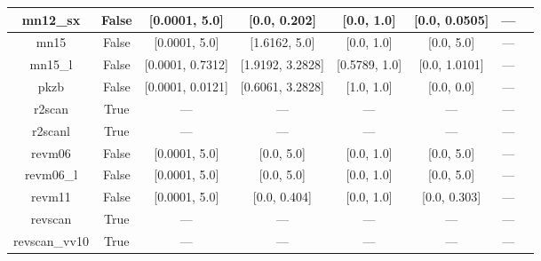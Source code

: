 \begin{tabular}{|c|c|c|c|c|c|c|l|}
     mn12\_sx &                 False &    [0.0001, 5.0] &     [0.0, 0.202] &    [0.0, 1.0] &  [0.0, 0.0505] &        --- &                                                          \cite{Peverati2012_16187} \\ \hline
         mn15 &                 False &    [0.0001, 5.0] &    [1.6162, 5.0] &    [0.0, 1.0] &     [0.0, 5.0] &        --- &                                                                 \cite{Yu2016_5032} \\ \hline
      mn15\_l &                 False & [0.0001, 0.7312] & [1.9192, 3.2828] & [0.5789, 1.0] &  [0.0, 1.0101] &        --- &                                                                 \cite{Yu2016_1280} \\ \hline
         pkzb &                 False & [0.0001, 0.0121] & [0.6061, 3.2828] &    [1.0, 1.0] &     [0.0, 0.0] &        --- &                                                             \cite{Perdew1999_2544} \\ \hline
       r2scan &                  True &              --- &              --- &           --- &            --- &        --- &                                           \cite{Furness2020_8208,Furness2020_9248} \\ \hline
      r2scanl &                  True &              --- &              --- &           --- &            --- &        --- &                          \cite{Mejia2020_121109,Furness2020_8208,Furness2020_9248} \\ \hline
       revm06 &                 False &    [0.0001, 5.0] &       [0.0, 5.0] &    [0.0, 1.0] &     [0.0, 5.0] &        --- &                                                              \cite{Wang2018_10257} \\ \hline
    revm06\_l &                 False &    [0.0001, 5.0] &       [0.0, 5.0] &    [0.0, 1.0] &     [0.0, 5.0] &        --- &                                                               \cite{Wang2017_8487} \\ \hline
       revm11 &                 False &    [0.0001, 5.0] &     [0.0, 0.404] &    [0.0, 1.0] &   [0.0, 0.303] &        --- &                                                              \cite{Verma2019_2966} \\ \hline
      revscan &                  True &              --- &              --- &           --- &            --- &        --- &                                                              \cite{Mezei2018_2469} \\ \hline
revscan\_vv10 &                  True &              --- &              --- &           --- &            --- &        --- &                                                              \cite{Mezei2018_2469} \\ \hline

\end{tabular}
